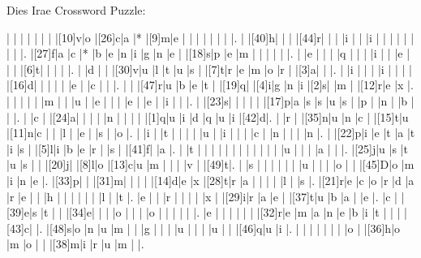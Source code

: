 \documentclass[12pt]{article}
\begin{document}
\libertine
\renewcommand\PuzzleClueFont{\rm\normalsize}

\begin{center}
  \huge{Dies Irae Crossword Puzzle:}
\end{center}
\vspace{1.5cm}
\begin{Puzzle}{22}{24}
  |{}  |{}  |{}  |{}  |{}  |{}  |{}  |[10]v|o   |[26]c|a   |*   |[9]m|e   |{}  |{}  |{}  |{}  |{}  |{}  |{}  |.
  |{}  |[40]h|{}  |{}  |{}  |[44]r|{}  |{}  |{}  |i   |{}  |{}  |i   |{}  |{}  |{}  |{}  |{}  |{}  |{}  |{}  |.
  |[27]f|a   |c   |*   |b   |e   |n   |i   |g   |n   |e   |{}  |[18]s|p   |e   |m   |{}  |{}  |{}  |{}  |{}  |.
  |{}  |e   |{}  |{}  |{}  |q   |{}  |{}  |{}  |i   |{}  |{}  |e   |{}  |{}  |{}  |[6]t|{}  |{}  |{}  |{}  |.
  |{}  |d   |{}  |{}  |[30]v|u   |l   |t   |u   |s   |{}  |[7]t|r   |e   |m   |o   |r   |{}  |[3]a|{}  |{}  |.
  |{}  |i   |{}  |{}  |{}  |i   |{}  |{}  |{}  |{}  |[16]d|{}  |{}  |{}  |{}  |{}  |e   |{}  |c   |{}  |{}  |.
  |{}  |{}  |[47]r|u   |b   |e   |t   |{}  |[19]q|{}  |[4]i|g   |n   |i   |[2]s|{}  |m   |{}  |[12]r|e   |x   |.
  |{}  |{}  |{}  |{}  |{}  |m   |{}  |{}  |u   |{}  |e   |{}  |{}  |{}  |e   |{}  |e   |{}  |i   |{}  |{}  |.
  |{}  |[23]s|{}  |{}  |{}  |{}  |{}  |[17]p|a   |s   |s   |u   |s   |{}  |p   |{}  |n   |{}  |b   |{}  |{}  |.
  |{}  |c   |{}  |[24]a|{}  |{}  |{}  |{}  |n   |{}  |{}  |{}  |{}  |[1]q|u   |i   |d   |q   |u   |i   |[42]d|.
  |{}  |r   |{}  |[35]n|u   |n   |c   |{}  |[15]t|u   |[11]n|c   |{}  |{}  |l   |{}  |e   |{}  |s   |{}  |o   |.
  |{}  |i   |{}  |t   |{}  |{}  |{}  |{}  |u   |{}  |i   |{}  |{}  |{}  |c   |{}  |n   |{}  |{}  |{}  |n   |.
  |{}  |[22]p|i   |e   |t   |a   |t   |i   |s   |{}  |[5]l|i   |b   |e   |r   |{}  |s   |{}  |[41]f|{}  |a   |.
  |{}  |t   |{}  |{}  |{}  |{}  |{}  |{}  |{}  |{}  |{}  |{}  |{}  |{}  |u   |{}  |{}  |{}  |a   |{}  |{}  |.
  |[25]j|u   |s   |t   |u   |s   |{}  |{}  |[20]j|{}  |[8]l|o   |[13]c|u   |m   |{}  |{}  |{}  |v   |{}  |[49]t|.
  |{}  |s   |{}  |{}  |{}  |{}  |{}  |{}  |u   |{}  |{}  |{}  |o   |{}  |{}  |[45]D|o   |m   |i   |n   |e   |.
  |[33]p|{}  |{}  |[31]m|{}  |{}  |{}  |{}  |[14]d|e   |x   |[28]t|r   |a   |{}  |{}  |{}  |{}  |l   |{}  |s   |.
  |[21]r|e   |c   |o   |r   |d   |a   |r   |e   |{}  |{}  |h   |{}  |{}  |{}  |{}  |{}  |{}  |l   |{}  |t   |.
  |e   |{}  |{}  |r   |{}  |{}  |{}  |{}  |x   |{}  |[29]i|r   |a   |e   |{}  |[37]t|u   |b   |a   |{}  |e   |.
  |c   |{}  |[39]e|s   |t   |{}  |{}  |[34]e|{}  |{}  |{}  |o   |{}  |{}  |{}  |o   |{}  |{}  |{}  |{}  |{}  |.
  |e   |{}  |{}  |{}  |{}  |{}  |{}  |[32]r|e   |m   |a   |n   |e   |b   |i   |t   |{}  |{}  |{}  |[43]c|{}  |.
  |[48]s|o   |n   |u   |m   |{}  |{}  |g   |{}  |{}  |{}  |u   |{}  |{}  |{}  |u   |{}  |{}  |[46]q|u   |i   |.
  |{}  |{}  |{}  |{}  |{}  |{}  |{}  |o   |{}  |[36]h|o   |m   |o   |{}  |{}  |[38]m|i   |r   |u   |m   |{}  |.
\end{Puzzle}
\end{document}
